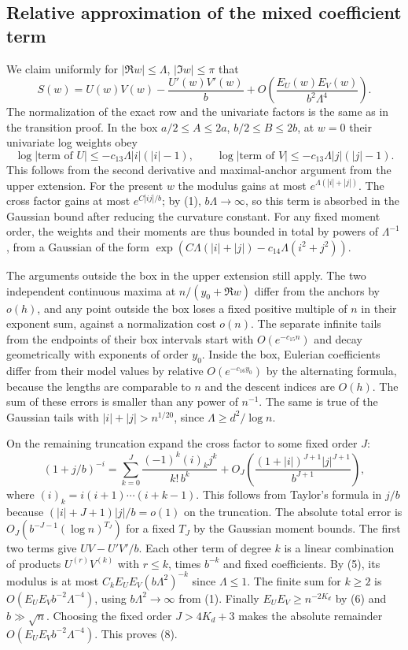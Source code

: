 \documentclass[11pt]{article}
\begin{document}
\subsection{Relative approximation of the mixed coefficient term}

We claim uniformly for $|\Re w|\le\Lambda$, $|\Im w|\le\pi$ that
\[
 S(w)=U(w)V(w)-\frac{U'(w)V'(w)}b
        +O\!\left(\frac{E_U(w)E_V(w)}{b^2\Lambda^4}\right).
 \tag{8}
\]
The normalization of the exact row and the univariate factors is the same as in the transition proof. In the box $a/2\le A\le2a$, $b/2\le B\le2b$, at $w=0$ their univariate log weights obey
\[
 \log |\text{term of }U|\le -c_{13}\Lambda |i|(|i|-1),\qquad
 \log |\text{term of }V|\le -c_{13}\Lambda |j|(|j|-1).
\]
This follows from the second derivative and maximal-anchor argument from the upper extension. For the present $w$ the modulus gains at most $e^{\Lambda(|i|+|j|)}$. The cross factor gains at most $e^{C|ij|/b}$; by (1), $b\Lambda\to\infty$, so this term is absorbed in the Gaussian bound after reducing the curvature constant. For any fixed moment order, the weights and their moments are thus bounded in total by powers of $\Lambda^{-1}$, from a Gaussian of the form $\exp(C\Lambda(|i|+|j|)-c_{14}\Lambda(i^2+j^2))$.

The arguments outside the box in the upper extension still apply. The two independent continuous maxima at $n/(y_0+\Re w)$ differ from the anchors by $o(h)$, and any point outside the box loses a fixed positive multiple of $n$ in their exponent sum, against a normalization cost $o(n)$. The separate infinite tails from the endpoints of their box intervals start with $O(e^{-c_{15}n})$ and decay geometrically with exponents of order $y_0$. Inside the box, Eulerian coefficients differ from their model values by relative $O(e^{-c_{16}y_0})$ by the alternating formula, because the lengths are comparable to $n$ and the descent indices are $O(h)$. The sum of these errors is smaller than any power of $n^{-1}$. The same is true of the Gaussian tails with $|i|+|j|>n^{1/20}$, since $\Lambda\ge d^2/\log n$.

On the remaining truncation expand the cross factor to some fixed order $J$:
\[
 (1+j/b)^{-i}=
  \sum_{k=0}^J \frac{(-1)^k(i)_k j^k}{k!\,b^k}
  +O_J\left(\frac{(1+|i|)^{J+1}|j|^{J+1}}{b^{J+1}}\right),
\]
where $(i)_k=i(i+1)\cdots(i+k-1)$. This follows from Taylor's formula in $j/b$ because $(|i|+J+1)|j|/b=o(1)$ on the truncation. The absolute total error is $O_J(b^{-J-1}(\log n)^{T_J})$ for a fixed $T_J$ by the Gaussian moment bounds. The first two terms give $UV-U'V'/b$. Each other term of degree $k$ is a linear combination of products $U^{(r)}V^{(k)}$ with $r\le k$, times $b^{-k}$ and fixed coefficients. By (5), its modulus is at most $C_k E_UE_V(b\Lambda^2)^{-k}$ since $\Lambda\le1$. The finite sum for $k\ge2$ is $O(E_UE_V b^{-2}\Lambda^{-4})$, using $b\Lambda^2\to\infty$ from (1). Finally $E_UE_V\ge n^{-2K_d}$ by (6) and $b\gg\sqrt n$. Choosing the fixed order $J>4K_d+3$ makes the absolute remainder $O(E_UE_V b^{-2}\Lambda^{-4})$. This proves (8).
\end{document}
